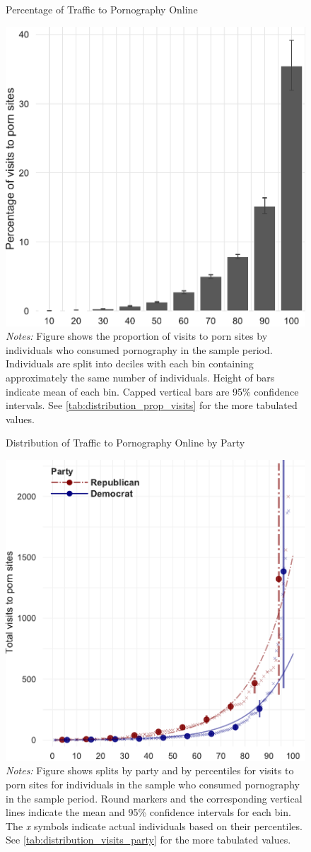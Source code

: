 \documentclass[12pt, letterpaper]{article}
\begin{document}
\begin{figure}
	\centering
	\caption{Percentage of Traffic to Pornography Online}
	\includegraphics[width=.5\linewidth]{../figs/distribution_proportion_visits_to_adultsites.pdf}
	\caption*{\footnotesize \emph{Notes:} 
		Figure shows the proportion of visits to porn sites by individuals who consumed pornography in the sample period.
		Individuals are split into deciles with each bin containing approximately the same number of individuals.
		Height of bars indicate mean of each bin.
		Capped vertical bars are 95\% confidence intervals.
		See \cref{tab:distribution_prop_visits} for the more tabulated values.
	}
	\label{fig:distribution_prop_visits}
\end{figure}



\begin{figure}
	\centering
	\caption{Distribution of Traffic to Pornography Online by Party}
	\includegraphics[width=.55\linewidth]{../figs/distribution_visits_to_adultsites_by_party.pdf}
	\caption*{\footnotesize \emph{Notes:} 
		Figure shows splits by party and by percentiles for visits to porn sites for individuals in the sample who consumed pornography in the sample period.
		Round markers and the corresponding vertical lines indicate the mean and 95\% confidence intervals for each bin.
		The \emph{x} symbols indicate actual individuals based on their percentiles.
		See \cref{tab:distribution_visits_party} for the more tabulated values.
	}
	\label{fig:distribution_visits_party}
\end{figure}
\end{document}
